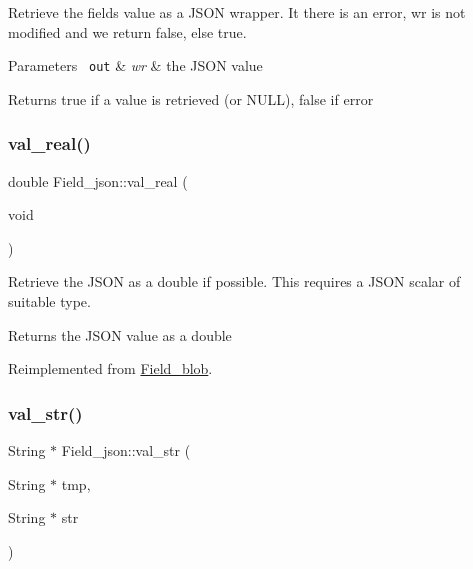 Retrieve the field\textquotesingle{}s value as a J\+S\+ON wrapper. It there is an error, wr is not modified and we return false, else true.


\begin{DoxyParams}[1]{Parameters}
\mbox{\texttt{ out}}  & {\em wr} & the J\+S\+ON value \\
\hline
\end{DoxyParams}
\begin{DoxyReturn}{Returns}
true if a value is retrieved (or N\+U\+LL), false if error 
\end{DoxyReturn}
\mbox{\label{classField__json_a762fad5750af247d8d2ebbc3dedf2113}} 
\subsubsection{\texorpdfstring{val\+\_\+real()}{val\_real()}}
{\footnotesize\ttfamily double Field\+\_\+json\+::val\+\_\+real (\begin{DoxyParamCaption}\item[{void}]{ }\end{DoxyParamCaption})\hspace{0.3cm}{\ttfamily [virtual]}}

Retrieve the J\+S\+ON as a double if possible. This requires a J\+S\+ON scalar of suitable type.

\begin{DoxyReturn}{Returns}
the J\+S\+ON value as a double 
\end{DoxyReturn}


Reimplemented from \mbox{\hyperlink{classField__blob}{Field\+\_\+blob}}.

\mbox{\label{classField__json_a1a8e0ba0f036d69c1b7567fcf7d9493a}} 
\subsubsection{\texorpdfstring{val\+\_\+str()}{val\_str()}}
{\footnotesize\ttfamily String $\ast$ Field\+\_\+json\+::val\+\_\+str (\begin{DoxyParamCaption}\item[{String $\ast$}]{tmp,  }\item[{String $\ast$}]{str }\end{DoxyParamCaption})\hspace{0.3cm}{\ttfamily [virtual]}}

